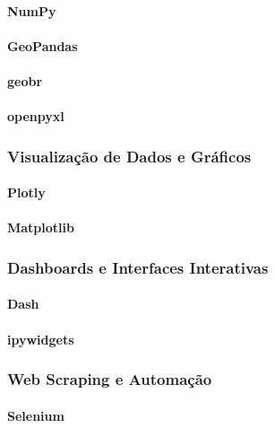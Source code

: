 \paragraph{NumPy} 

\paragraph{GeoPandas}

\paragraph{geobr} 

\paragraph{openpyxl} 

\subsubsection{Visualização de Dados e Gráficos}

\paragraph{Plotly} 

\paragraph{Matplotlib} 

\subsubsection{Dashboards e Interfaces Interativas}

\paragraph{Dash}

\paragraph{ipywidgets} 

\subsubsection{Web Scraping e Automação}

\paragraph{Selenium} 

